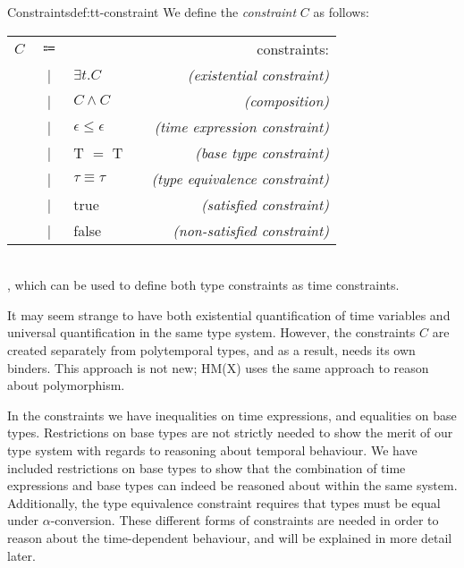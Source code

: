 \begin{definitiontitled}{Constraints}{def:tt-constraint}
We define the \textit{constraint} $C$ as follows:\\
\begin{tabularx}{0.75\textwidth}{lc X lr}
$C$     & $\Coloneqq$ &                           & & constraints:                          \\
        & |           & $\exists t. C$            & & \textit{(existential constraint)}     \\
        & |           & $C \land C$               & & \textit{(composition)}                \\
        & |           & $\epsilon \leq \epsilon$  & & \textit{(time expression constraint)} \\
        & |           & T $=$ T                   & & \textit{(base type constraint)}       \\
        & |           & $\tau \equiv \tau$        & & \textit{(type equivalence constraint)}\\
        & |           & true                      & & \textit{(satisfied constraint)}       \\
        & |           & false                     & & \textit{(non-satisfied constraint)}   \\
\end{tabularx}\\
, which can be used to define both type constraints as time constraints.
\end{definitiontitled}

It may seem strange to have both existential quantification of time variables and universal quantification in the same type system.
However, the constraints $C$ are created separately from polytemporal types, and as a result, needs its own binders.
This approach is not new; HM(X) uses the same approach to reason about polymorphism.

In the constraints we have inequalities on time expressions, and equalities on base types.
Restrictions on base types are not strictly needed to show the merit of our type system with regards to reasoning about temporal behaviour.
We have included restrictions on base types to show that the combination of time expressions and base types can indeed be reasoned about within the same system.
Additionally, the type equivalence constraint requires that types must be equal under $\alpha$-conversion.
These different forms of constraints are needed in order to reason about the time-dependent behaviour, and will be explained in more detail later.

